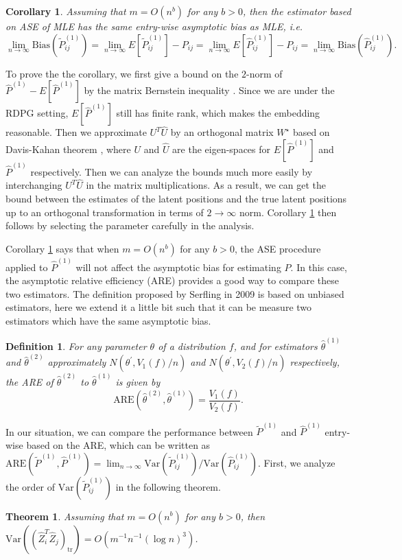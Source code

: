 \documentclass[a4paper]{article}
\newtheorem{theorem}[fact]{Theorem}
\newtheorem{definition}[fact]{Definition}
\newtheorem{corollary}[fact]{Corollary}
\renewcommand{\hat}{\widehat}
\begin{document}
\begin{corollary}
\label{cor:L1Consistent}
Assuming that $m = O(n^b)$ for any $b > 0$, then the estimator based on ASE of MLE has the same entry-wise asymptotic bias as MLE, i.e.
\[
	\lim_{n \to \infty} \mathrm{Bias}(\widetilde{P}_{ij}^{(1)}) = \lim_{n \to \infty} E[\widetilde{P}_{ij}^{(1)}] - P_{ij} = \lim_{n \to \infty} E[\hat{P}^{(1)}_{ij}] - P_{ij}
    = \lim_{n \to \infty} \mathrm{Bias}(\hat{P}_{ij}^{(1)}).
\]
\end{corollary}

To prove the the corollary, we first give a bound on the $2$-norm of $\hat{P}^{(1)} - E[\hat{P}^{(1)}]$ by the matrix Bernstein inequality \cite{tropp2012user}. Since we are under the RDPG setting, $E[\hat{P}^{(1)}]$ still has finite rank, which makes the embedding reasonable. Then we approximate $U^T \hat{U}$ by an orthogonal matrix $W^{\star}$ based on Davis-Kahan theorem \cite{davis1970rotation}, where $U$ and $\hat{U}$ are the eigen-spaces for $E[\hat{P}^{(1)}]$ and $\hat{P}^{(1)}$ respectively. Then we can analyze the bounds much more easily by interchanging $U^T \hat{U}$ in the matrix multiplications. As a result, we can get the bound between the estimates of the latent positions and the true latent positions up to an orthogonal transformation in terms of $2 \to \infty$ norm. Corollary \ref{cor:L1Consistent} then follows by selecting the parameter carefully in the analysis.

Corollary \ref{cor:L1Consistent} says that when $m = O(n^b)$ for any $b > 0$, the ASE procedure applied to $\hat{P}^{(1)}$ will not affect the asymptotic bias for estimating $P$.
In this case, the asymptotic relative efficiency (ARE) \cite{serfling2011asymptotic} provides a good way to compare these two estimators. The definition proposed by Serfling in 2009 is based on unbiased estimators, here we extend it a little bit such that it can be measure two estimators which have the same asymptotic bias.
\begin{definition}
For any parameter $\theta$ of a distribution $f$, and for estimators $\hat{\theta}^{(1)}$ and $\hat{\theta}^{(2)}$ approximately $N(\theta^{\prime}, V_1(f)/n)$ and $N(\theta^{\prime}, V_2(f)/n)$ respectively, the ARE of $\hat{\theta}^{(2)}$ to $\hat{\theta}^{(1)}$ is given by
\[
	\mathrm{ARE}(\hat{\theta}^{(2)}, \hat{\theta}^{(1)}) = \frac{V_1(f)}{V_2(f)}.
\]
\end{definition}

In our situation, we can compare the performance between $\widetilde{P}^{(1)}$ and $\hat{P}^{(1)}$ entry-wise based on the ARE, which can be written as $\mathrm{ARE}(\widetilde{P}^{(1)}, \hat{P}^{(1)}) = \lim_{n \to \infty} \mathrm{Var}(\widetilde{P}_{ij}^{(1)})/\mathrm{Var}(\hat{P}_{ij}^{(1)})$. First, we analyze the order of $\mathrm{Var}(\widetilde{P}_{ij}^{(1)})$ in the following theorem.
\begin{theorem}
\label{thm:VarASEL1}
Assuming that $m = O(n^b)$ for any $b > 0$, then $\mathrm{Var}((\hat{Z}_i^T \hat{Z}_j)_{\mathrm{tr}}) = O(m^{-1} n^{-1} (\log n)^3)$.
\end{theorem}
\end{document}
